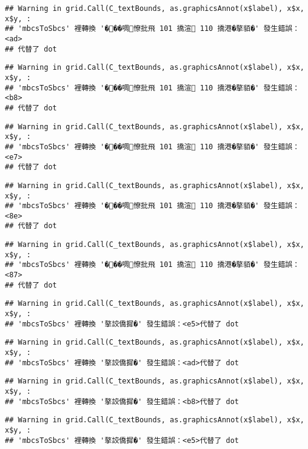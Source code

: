 \documentclass[
]{article}
\begin{document}
\begin{verbatim}
## Warning in grid.Call(C_textBounds, as.graphicsAnnot(x$label), x$x, x$y, :
## 'mbcsToSbcs' 裡轉換 '���啁憭批飛 101 撟渲 110 撟港�摮貊�' 發生錯誤：<ad>
## 代替了 dot
\end{verbatim}

\begin{verbatim}
## Warning in grid.Call(C_textBounds, as.graphicsAnnot(x$label), x$x, x$y, :
## 'mbcsToSbcs' 裡轉換 '���啁憭批飛 101 撟渲 110 撟港�摮貊�' 發生錯誤：<b8>
## 代替了 dot
\end{verbatim}

\begin{verbatim}
## Warning in grid.Call(C_textBounds, as.graphicsAnnot(x$label), x$x, x$y, :
## 'mbcsToSbcs' 裡轉換 '���啁憭批飛 101 撟渲 110 撟港�摮貊�' 發生錯誤：<e7>
## 代替了 dot
\end{verbatim}

\begin{verbatim}
## Warning in grid.Call(C_textBounds, as.graphicsAnnot(x$label), x$x, x$y, :
## 'mbcsToSbcs' 裡轉換 '���啁憭批飛 101 撟渲 110 撟港�摮貊�' 發生錯誤：<8e>
## 代替了 dot
\end{verbatim}

\begin{verbatim}
## Warning in grid.Call(C_textBounds, as.graphicsAnnot(x$label), x$x, x$y, :
## 'mbcsToSbcs' 裡轉換 '���啁憭批飛 101 撟渲 110 撟港�摮貊�' 發生錯誤：<87>
## 代替了 dot
\end{verbatim}

\begin{verbatim}
## Warning in grid.Call(C_textBounds, as.graphicsAnnot(x$label), x$x, x$y, :
## 'mbcsToSbcs' 裡轉換 '摮詨僑摨�' 發生錯誤：<e5>代替了 dot
\end{verbatim}

\begin{verbatim}
## Warning in grid.Call(C_textBounds, as.graphicsAnnot(x$label), x$x, x$y, :
## 'mbcsToSbcs' 裡轉換 '摮詨僑摨�' 發生錯誤：<ad>代替了 dot
\end{verbatim}

\begin{verbatim}
## Warning in grid.Call(C_textBounds, as.graphicsAnnot(x$label), x$x, x$y, :
## 'mbcsToSbcs' 裡轉換 '摮詨僑摨�' 發生錯誤：<b8>代替了 dot
\end{verbatim}

\begin{verbatim}
## Warning in grid.Call(C_textBounds, as.graphicsAnnot(x$label), x$x, x$y, :
## 'mbcsToSbcs' 裡轉換 '摮詨僑摨�' 發生錯誤：<e5>代替了 dot
\end{verbatim}
\end{document}
